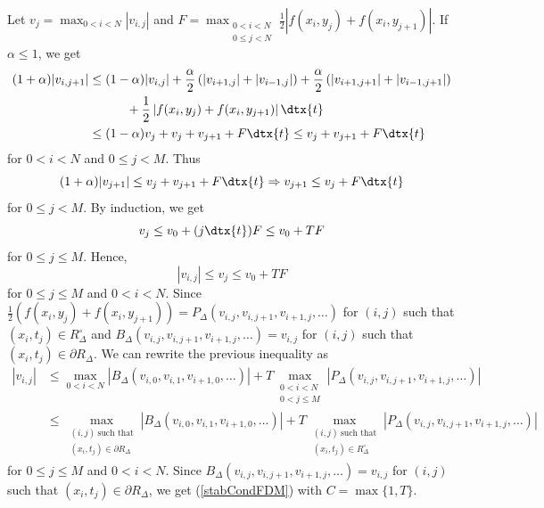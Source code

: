 {Let $\displaystyle v_j = \max_{0<i<N} |v_{i,j}|$ and
$\displaystyle F = \max_{\substack{0<i<N\\0\leq j<N}} \frac{1}{2}
  |f(x_i,y_j) + f(x_i,y_{j+1})|$.
If $\alpha \leq 1$, we get
\begin{align*}
(1 + \alpha) |v_{i,j+1}| &\leq (1-\alpha) |v_{i,j}|
+ \frac{\alpha}{2} \left( |v_{i+1,j}| + |v_{i-1,j}| \right)
+ \frac{\alpha}{2} \left( |v_{i+1,j+1}| + |v_{i-1,j+1}| \right) \\
& \qquad\quad + \frac{1}{2}\left| f(x_i,y_j) + f(x_i,y_{j+1})\right| \dtx{t} \\
& \leq (1-\alpha) v_j + v_j + v_{j+1} + F \dtx{t}
\leq v_j + v_{j+1} + F \dtx{t}
\end{align*}
for $0<i<N$ and $0\leq j < M$.  Thus
\[
(1 + \alpha) |v_{j+1}| \leq v_j + v_{j+1}  + F \dtx{t}
\Rightarrow
v_{j+1} \leq v_j + F \dtx{t}
\]
for $0\leq j < M$.  By induction, we get
\[
  v_j \leq v_0 + (j \dtx{t}) F \leq v_0 + T F 
\]
for $0\leq j \leq M$.  Hence,
\[
  |v_{i,j}| \leq v_j \leq v_0 + T F
\]
for $0\leq j \leq M$ and $0<i<N$.  Since
$\displaystyle \frac{1}{2}\left( f(x_i,y_j) + f(x_i,y_{j+1})\right)
= P_\Delta(v_{i,j},v_{i,j+1},v_{i+1,j},\ldots)$
for $(i,j)$ such that $\displaystyle (x_i,t_j) \in R_\Delta^\circ$
and $B_\Delta(v_{i,j},v_{i,j+1},v_{i+1,j},\ldots) = v_{i,j}$
for $(i,j)$ such that $(x_i,t_j) \in \partial R_\Delta$.  We can
rewrite the previous inequality as
\begin{align*}
|v_{i,j}| &\leq \max_{0<i<N}|B_\Delta(v_{i,0},v_{i,1},v_{i+1,0},\ldots)|
+ T \max_{\substack{0<i<N\\0<j\leq M}}|P_\Delta(v_{i,j},v_{i,j+1},v_{i+1,j},\ldots)|
\\
&\leq \max_{\substack{(i,j)\ \text{such that}\\(x_i,t_j) \in \partial R_\Delta}}
|B_\Delta(v_{i,0},v_{i,1},v_{i+1,0},\ldots)|
+ T \max_{\substack{(i,j)\ \text{such that}\\(x_i,t_j) \in R_\Delta^\circ}}
|P_\Delta(v_{i,j},v_{i,j+1},v_{i+1,j},\ldots)|
\end{align*}
for $0\leq j \leq M$ and $0<i<N$.  Since
$B_\Delta(v_{i,j},v_{i,j+1},v_{i+1,j},\ldots) = v_{i,j}$ for $(i,j)$
such that $(x_i,t_j) \in \partial R_\Delta$, we get 
(\ref{stabCondFDM}) with $C = \max \{1, T\}$.
}

